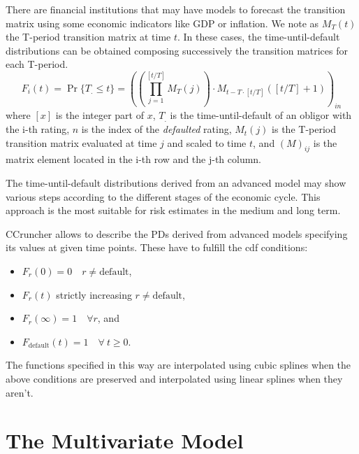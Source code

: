 \documentclass[11pt,fleqn]{book} %
\begin{document}
There are financial institutions that may have models to forecast the 
transition matrix using some economic indicators like GDP or inflation. We 
note as $M_T(t)$ the T-period transition matrix at time $t$. In these cases, 
the time-until-default distributions can be obtained composing successively 
the transition matrices for each T-period.
\begin{displaymath}
	F_i(t) = \Pr\{T_. \le t\} = \left(
		\left( \prod_{j=1}^{[t/T]} M_T(j) \right) \cdot 
		M_{t-T\cdot[t/T]}\left([t/T]+1\right) 
		\right)_{in}
\end{displaymath}
where $[x]$ is the integer part of $x$, $T_.$ is the time-until-default
of an obligor with the i-th rating, $n$ is the index of the \emph{defaulted} 
rating, $M_t(j)$ is the T-period transition matrix evaluated at time $j$ 
and scaled to time $t$, and $(M)_{ij}$ is the matrix element located in the 
i-th row and the j-th column.

The time-until-default distributions derived from an advanced model may show 
various steps according to the different stages of the economic cycle. This 
approach is the most suitable for risk estimates in the medium and long term.

CCruncher allows to describe the PDs derived from advanced models specifying 
its values at given time points. These have to fulfill the cdf conditions:
\begin{itemize}
	\item $F_r(0) = 0 \quad r \ne \text{default}$,
	\item $F_r(t)$ strictly increasing $r \ne \text{default}$, 
	\item $F_r(\infty) = 1 \quad \forall r$, and
	\item $F_{\text{default}}(t) = 1 \quad \forall\ t \ge 0$.
\end{itemize}
The functions specified in this way are interpolated using cubic splines
when the above conditions are preserved and interpolated using linear splines 
when they aren't.


\section{The Multivariate Model}
\end{document}
